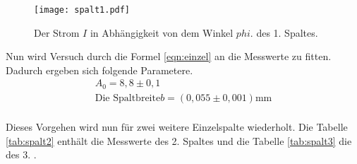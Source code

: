 \begin{figure}
  \centering
  \texttt{[image: spalt1.pdf]}
  \caption{ Der Strom $I$ in Abhängigkeit von dem Winkel $phi$. des 1. Spaltes.}
  \label{fig:spalt1}
\end{figure}

Nun wird Versuch durch die Formel \eqref{eqn:einzel} an die Messwerte zu fitten.
Dadurch ergeben sich folgende Parametere.
\begin{align*}
  A_0=8,8\pm0,1\\
  \text{Die Spaltbreite} b=(0,055\pm0,001)\si{\milli\meter}\\
\end{align*}

Dieses Vorgehen wird nun für zwei weitere Einzelspalte wiederholt.
Die Tabelle \ref{tab:spalt2} enthält die Messwerte des 2. Spaltes
und die Tabelle \ref{tab:spalt3} die des 3. .




